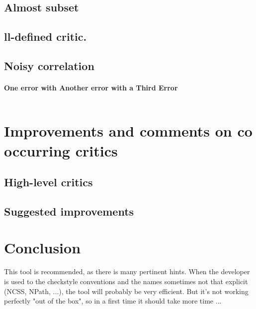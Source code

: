\documentclass{article}
\begin{document}
\subsection{Almost subset}

\subsection{ll-defined critic.}

\subsection{Noisy correlation}
\paragraph{One error with Another error with a Third Error}  
\begin{lstlisting}
\end{lstlisting}

\section{Improvements and comments on co occurring critics} 
\subsection{High-level critics}

\subsection{Suggested improvements}
\section{Conclusion}
This tool is recommended, as there is many pertinent hints. When the developer is used to the checkstyle conventions and the names sometimes not that explicit (NCSS, NPath, ...), the tool will probably be very efficient. But it's not working perfectly "out of the box", so in a first time it should take more time ...
\end{document}
